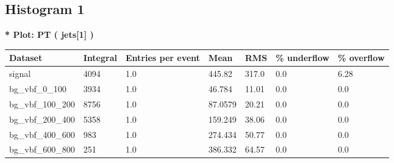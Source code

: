 \documentclass[a4paper, 10pt]{article}
\begin{document}
   \newpage
\subsection{ Histogram 1}

\textbf{* Plot: PT ( jets[1] ) }\\
   \begin{table}[H]
  \begin{center}
    \begin{tabular}{|m{23.0mm}|m{23.0mm}|m{18.0mm}|m{19.0mm}|m{19.0mm}|m{19.0mm}|m{19.0mm}|}
      \hline
      {\cellcolor{yellow}         Dataset}& {\cellcolor{yellow}         Integral}& {\cellcolor{yellow}         Entries per event}& {\cellcolor{yellow}         Mean}& {\cellcolor{yellow}         RMS}& {\cellcolor{yellow}         \% underflow}& {\cellcolor{yellow}         \% overflow}\\
      \hline
      {\cellcolor{white}         signal}& {\cellcolor{white}         4094}& {\cellcolor{white}         1.0}& {\cellcolor{white}         445.82}& {\cellcolor{white}         317.0}& {\cellcolor{orange}         0.0}& {\cellcolor{orange}         6.28}\\
      \hline
      {\cellcolor{white}         bg\_vbf\_0\_100}& {\cellcolor{white}         3934}& {\cellcolor{white}         1.0}& {\cellcolor{white}         46.784}& {\cellcolor{white}         11.01}& {\cellcolor{green}         0.0}& {\cellcolor{green}         0.0}\\
      \hline
      {\cellcolor{white}         bg\_vbf\_100\_200}& {\cellcolor{white}         8756}& {\cellcolor{white}         1.0}& {\cellcolor{white}         87.0579}& {\cellcolor{white}         20.21}& {\cellcolor{green}         0.0}& {\cellcolor{green}         0.0}\\
      \hline
      {\cellcolor{white}         bg\_vbf\_200\_400}& {\cellcolor{white}         5358}& {\cellcolor{white}         1.0}& {\cellcolor{white}         159.249}& {\cellcolor{white}         38.06}& {\cellcolor{green}         0.0}& {\cellcolor{green}         0.0}\\
      \hline
      {\cellcolor{white}         bg\_vbf\_400\_600}& {\cellcolor{white}         983}& {\cellcolor{white}         1.0}& {\cellcolor{white}         274.434}& {\cellcolor{white}         50.77}& {\cellcolor{green}         0.0}& {\cellcolor{green}         0.0}\\
      \hline
      {\cellcolor{white}         bg\_vbf\_600\_800}& {\cellcolor{white}         251}& {\cellcolor{white}         1.0}& {\cellcolor{white}         386.332}& {\cellcolor{white}         64.57}& {\cellcolor{green}         0.0}& {\cellcolor{green}         0.0}\\

\end{tabular}
\end{center}
\end{table}
\end{document}
